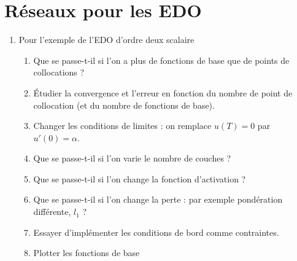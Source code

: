 \documentclass[11pt,a4paper, french]{article}
\begin{document}
\section{Réseaux pour les EDO}\label{sec:}
%
\begin{enumerate}
\item Pour l'exemple de l'EDO d'ordre deux scalaire
\begin{enumerate}
\item Que se passe-t-il si l'on a plus de fonctions de base que de points de collocations ?
\item Étudier la convergence et l'erreur en fonction du nombre de point de collocation (et du nombre de fonctions de base).
\item Changer les conditions de limites : on remplace $u(T)=0$ par $u'(0)=\alpha$.
\item Que se passe-t-il si l'on varie le nombre de couches ?
\item Que se passe-t-il si l'on change la fonction d'activation ?
\item Que se passe-t-il si l'on change la perte : par exemple pondération différente, $l_1$ ?
\item Essayer d'implémenter les conditions de bord comme contraintes.
\item Plotter les fonctions de base
\end{enumerate}
\end{enumerate}
%
\end{document}

